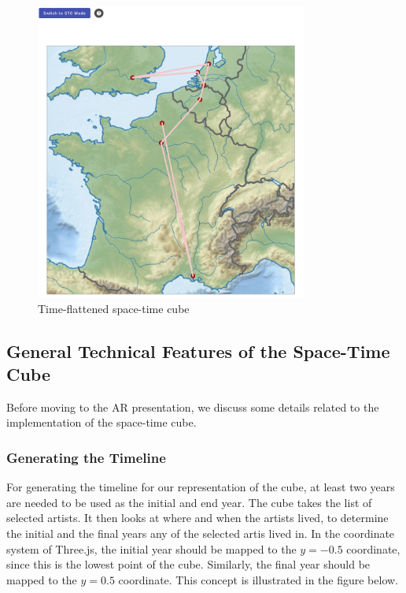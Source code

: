 \begin{figure}[hbt!]
    \begin{center}
        \includegraphics[width=0.8\textwidth]{graphics/3-implementation/11}
    \end{center}
    \caption{Time-flattened space-time cube}
    \label{fig:figure3.11}
\end{figure}

\clearpage

\subsection{General Technical Features of the Space-Time Cube}\label{subsec:technical-specifics-stc}
Before moving to the AR presentation, we discuss some details related to the implementation of the space-time cube.

\subsubsection{Generating the Timeline}

For generating the timeline for our representation of the cube, at least two years are needed to be used as the initial and end year. The cube
takes the list of selected artists. It then looks at where and when the artists lived, to determine the initial and the final years any of the
selected artis lived in. In the coordinate system of Three.js, the initial year should be mapped to the $y=-0.5$ coordinate, since this is the
lowest point of the cube. Similarly, the final year should be mapped to the $y=0.5$ coordinate. This concept is illustrated in the figure below.

